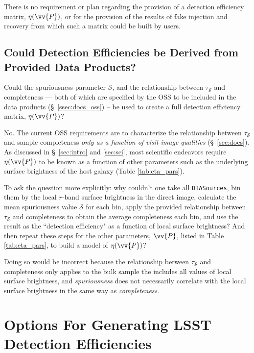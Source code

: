 \documentclass[DM,lsstdraft,toc]{lsstdoc}
\begin{document}
There is no requirement or plan regarding the provision of a detection efficiency matrix, $\eta(\vv{P})$, or for the provision of the results of fake injection and recovery from which such a matrix could be built by users.


\subsection{Could Detection Efficiencies be Derived from Provided Data Products?}\label{ssec:docs_derDE}

Could the spuriousness parameter $\mathcal{S}$, and the relationship between $\tau_{\mathcal{S}}$ and completeness --- both of which are specified by the OSS to be included in the data products (\S~\ref{ssec:docs_oss}) -- be used to create a full detection efficiency matrix, $\eta(\vv{P})$? 

No. The current OSS requirements are to characterize the relationship between $\tau_{\mathcal{S}}$ and sample completeness {\it only as a function of visit image qualities} (\S~\ref{sec:docs}). As discussed in \S~\ref{sec:intro} and \ref{sec:sci}, most scientific endeavors require $\eta(\vv{P})$ to be known as a function of other parameters such as the underlying surface brightness of the host galaxy (Table \ref{tab:eta_pars}).

To ask the question more explicitly: why couldn't one take all {\tt DIASources}, bin them by the local $r$-band surface brightness in the direct image, calculate the mean spuriousness value $\mathcal{S}$ for each bin, apply the provided relationship between $\tau_{\mathcal{S}}$ and completeness to obtain the average completeness each bin, and use the result as the ``detection efficiency" as a function of local surface brightness? And then repeat these steps for the other parameters, $\vv{P}$, listed in Table \ref{tab:eta_pars}, to build a model of $\eta(\vv{P})$?

Doing so would be incorrect because the relationship between $\tau_{\mathcal{S}}$ and completeness only applies to the bulk sample the includes all values of local surface brightness, and {\it spuriousness} does not necessarily correlate with the local surface brightness in the same way as {\it completeness}.



\section{Options For Generating LSST Detection Efficiencies} \label{sec:DE}
\end{document}
